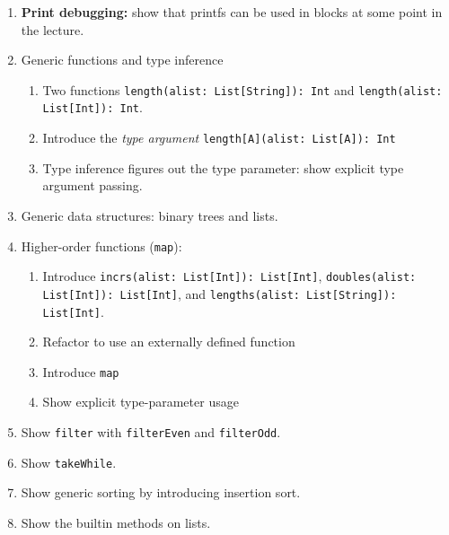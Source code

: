 \documentclass[9pt]{extbook}
\begin{document}
  
\begin{enumerate}

  \item \textbf{Print debugging:} show that printfs can be used in blocks at some point in the lecture.

  \item Generic functions and type inference
  
  \begin{enumerate}

  \item Two functions \lstinline|length(alist: List[String]): Int| and \lstinline|length(alist: List[Int]): Int|.

  \item Introduce the \emph{type argument} \lstinline|length[A](alist: List[A]): Int|

  \item Type inference figures out the type parameter: show explicit type argument passing.

  \end{enumerate}

  \item Generic data structures: binary trees and lists.

  \item Higher-order functions (\lstinline|map|):

  \begin{enumerate}

    \item Introduce \lstinline|incrs(alist: List[Int]): List[Int]|,
      \lstinline|doubles(alist: List[Int]): List[Int]|, and \lstinline|lengths(alist: List[String]): List[Int]|.

    \item Refactor to use an externally defined function

    \item Introduce \lstinline|map|

    \item Show explicit type-parameter usage

  \end{enumerate}

  \item Show \lstinline|filter| with \lstinline|filterEven| and \lstinline|filterOdd|.

  \item Show \lstinline|takeWhile|.

  \item Show generic sorting by introducing insertion sort.

  \item Show the builtin methods on lists.

\end{enumerate}
\end{document}
